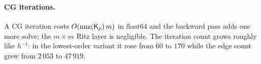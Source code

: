 \paragraph{CG iterations.}
A CG iteration costs $O(\mathrm{nnz}(\Kp)\,m)$ in float64 and the backward pass adds one more solve; the $m\times m$ Ritz layer is negligible.
The iteration count grows roughly like $h^{-1}$: in the lowest-order variant it rose from $60$ to $170$ while the edge count grew from $2\,053$ to $47\,919$.
